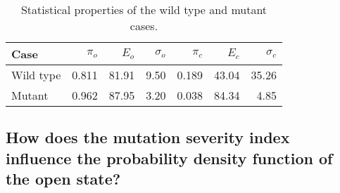 \begin{table}[ptb]
\begin{center}%
\begin{tabular}
[c]{|l|r|r|r||r|r|r|}\hline
Case & $\pi_{o}$ & $E_{o}$ & $\sigma_{o}$ & $\pi_{c}$ & $E_{c}$ & $\sigma_{c}%
$\\\hline
Wild type & 0.811 & 81.91 & 9.50 & 0.189 & 43.04 & 35.26\\\hline
Mutant & 0.962 & 87.95 & 3.20 & 0.038 & 84.34 & 4.85\\\hline
\end{tabular}
\end{center}
\caption{Statistical properties of the wild type and mutant cases.}%
\label{stat1D}%
\end{table}



\subsection{How does the mutation severity index influence the probability
density function of the open state?}

